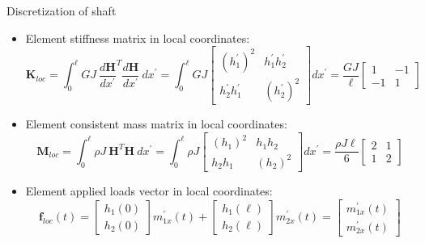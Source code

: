 \documentclass[aspectratio=169]{beamer}
\begin{document}
\begin{frame}{Discretization of shaft}
  \begin{itemize}
    \item Element stiffness matrix in local coordinates:
          \[ \mathbf{K}_{loc} =\int_0^{\ell}  GJ\ \frac{d\mathbf{H}}{dx^\prime}^T\frac{d\mathbf{H}}{dx^\prime}\ dx^\prime =\int_0^{\ell}  GJ \begin{bmatrix} (h_1^\prime)^2 & h_1^\prime h_2^\prime \\  h_2^\prime h_1^\prime &  (h_2^\prime)^2 \end{bmatrix} dx^\prime =\frac{GJ}{\ell} \begin{bmatrix} 1 & -1 \\ -1 & 1 \end{bmatrix} \]
    \item Element consistent mass matrix in local coordinates:
          \[ \mathbf{M}_{loc} =\int_0^{\ell}  \rho J\ \mathbf{H}^T\mathbf{H}\ dx^\prime =\int_0^{\ell}\rho J \begin{bmatrix} (h_1)^2 &h_1 h_2 \\  h_2 h_1 &  (h_2)^2 \end{bmatrix} dx^\prime =\frac{\rho J\ell }{6} \begin{bmatrix} 2 & 1 \\ 1 & 2 \end{bmatrix} \]
    \item Element applied loads vector in local coordinates:
          \[ \mathbf{f}_{loc}(t) =\begin{bmatrix} h_1(0) \\ h_2(0)\end{bmatrix}m_{1x}^\prime(t) + \begin{bmatrix} h_1(\ell) \\ h_2(\ell)\end{bmatrix}m_{2x}^\prime(t) = \begin{bmatrix} m_{1x}^\prime(t) \\ m_{2x}^\prime(t) \end{bmatrix} \]
  \end{itemize}
\end{frame}
\end{document}
